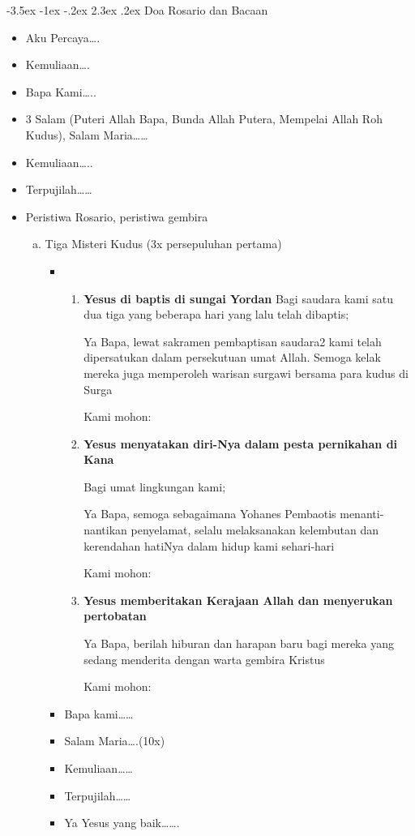 \documentclass[a5paper,titlepage,12pt]{scrbook}
\makeatletter
\renewcommand{\section}{\@startsection {section}{1}{\z@}%
                                   {-3.5ex \@plus -1ex \@minus -.2ex}%
                                   {2.3ex \@plus.2ex}%
                                   {\normalfont\normalsize\bfseries}}
\newcommand{\terbaptis}{satu dua tiga }
\makeatother
\begin{document}
\section{Doa Rosario dan Bacaan}
\begin{itemize}
	\item Aku Percaya{\dots}.
	\item Kemuliaan{\dots}.
	\item Bapa Kami{\dots}..
	\item 3 Salam (Puteri Allah Bapa, Bunda Allah Putera, Mempelai Allah Roh Kudus), Salam Maria{\dots}{\dots}
	\item Kemuliaan{\dots}..
	\item Terpujilah{\dots}{\dots}
	\item Peristiwa Rosario, peristiwa gembira 
	
	\begin{enumerate}[a.]
		\item Tiga Misteri Kudus (3x persepuluhan pertama)		
			\begin{itemize}
				\item 
				 	\begin{enumerate}
						\item \textbf{Yesus di baptis di sungai Yordan}
Bagi saudara kami \terbaptis yang beberapa hari yang lalu telah dibaptis;

Ya Bapa, lewat sakramen pembaptisan saudara2 kami telah dipersatukan dalam persekutuan umat Allah. Semoga kelak mereka juga memperoleh warisan surgawi bersama para kudus di Surga 

Kami mohon:
						
						\item \textbf{Yesus menyatakan diri-Nya dalam pesta pernikahan di Kana}
						  
Bagi umat lingkungan kami;

Ya Bapa, semoga sebagaimana Yohanes Pembaotis menanti-nantikan penyelamat, selalu melaksanakan kelembutan dan kerendahan hatiNya dalam hidup kami sehari-hari
						
						Kami mohon:

						\item \textbf{Yesus memberitakan Kerajaan Allah dan menyerukan pertobatan}

Ya Bapa, berilah hiburan dan harapan baru bagi mereka yang sedang menderita dengan warta gembira Kristus

Kami mohon:

					\end{enumerate}
				\item Bapa kami{\dots}{\dots}
				\item Salam Maria{\dots}.(10x)
				\item Kemuliaan{\dots}{\dots}
				\item Terpujilah{\dots}{\dots}
				\item Ya Yesus yang baik{\dots}{\dots}.
			\end{itemize}


\end{enumerate}
\end{itemize}
\end{document}
